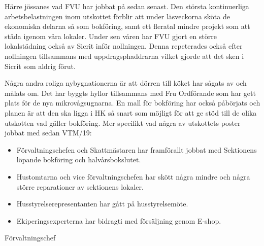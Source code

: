 \documentclass[../_main/handlingar.tex]{subfiles}
\begin{document}
\vspace{8px}

Härre jössanes vad FVU har jobbat på sedan senast. Den största kontinuerliga arbetsbelastningen inom utskottet förblir att under läsveckorna sköta de ekonomiska delarna så som bokföring, samt ett fleratal mindre projekt som att städa igenom våra lokaler. 
Under sen våren har FVU gjort en större lokalstädning också av Sicrit inför nollningen. Denna repeterades också efter nollningen tillsammans med uppdragsphaddrarna vilket gjorde att det sken i Sicrit som aldrig förut.

Några andra roliga nybygnationerna är att dörren till köket har sågats av och målats om. 
Det har byggts hyllor tillsammans med Fru Ordförande som har gett plats för de nya mikrovågsugnarna. En mall för bokföring har också påbörjats och planen är att den ska  ligga i HK så snart som möjligt för att ge stöd till de olika utskotten vad gäller bokföring. Mer specifikt vad några av utskottets poster jobbat med sedan VTM/19:

\begin{itemize}
        \item Förvaltningschefen och Skattmästaren har framförallt jobbat med Sektionens löpande bokföring och halvårsbokslutet.
        \item Hustomtarna och vice förvaltningschefen har skött några mindre och några större reparationer av sektionens lokaler.
        \item Husstyrelserepresentanten har gått på husstyrelsemöte.
        \item Ekiperingsexperterna har bidragti med försäljning genom E-shop.
    \end{itemize}

\begin{signatures}{1}
    \mvh
    \signature{Henrik Ramström}{Förvaltningschef}
\end{signatures}
\end{document}
